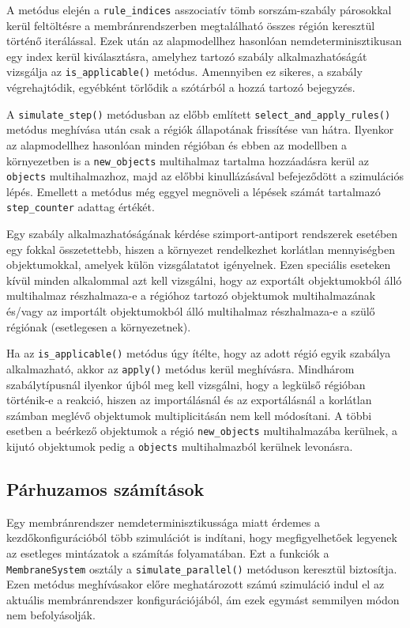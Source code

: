 A metódus elején a \verb|rule_indices| asszociatív tömb sorszám-szabály párosokkal kerül feltöltésre a membránrendszerben megtalálható összes régión keresztül történő iterálással. Ezek után az alapmodellhez hasonlóan nemdeterminisztikusan egy index kerül kiválasztásra, amelyhez tartozó szabály alkalmazhatóságát vizsgálja az \verb|is_applicable()| metódus. Amennyiben ez sikeres, a szabály végrehajtódik, egyébként törlődik a szótárból a hozzá tartozó bejegyzés.

A \verb|simulate_step()| metódusban az előbb említett \verb|select_and_apply_rules()| metódus meghívása után csak a régiók állapotának frissítése van hátra. Ilyenkor az alapmodellhez hasonlóan minden régióban és ebben az modellben a környezetben is a \verb|new_objects| multihalmaz tartalma hozzáadásra kerül az \verb|objects| multihalmazhoz, majd az előbbi kinullázásával befejeződött a szimulációs lépés. Emellett a metódus még eggyel megnöveli a lépések számát tartalmazó \verb|step_counter| adattag értékét.

Egy szabály alkalmazhatóságának kérdése szimport-antiport rendszerek esetében egy fokkal összetettebb, hiszen a környezet rendelkezhet korlátlan mennyiségben objektumokkal, amelyek külön vizsgálatatot igényelnek. Ezen speciális eseteken kívül minden alkalommal azt kell vizsgálni, hogy az exportált objektumokból álló multihalmaz részhalmaza-e a régióhoz tartozó objektumok multihalmazának és/vagy az importált objektumokból álló multihalmaz részhalmaza-e a szülő régiónak (esetlegesen a környezetnek).

Ha az \verb|is_applicable()| metódus úgy ítélte, hogy az adott régió egyik szabálya alkalmazható, akkor az \verb|apply()| metódus kerül meghívásra. Mindhárom szabálytípusnál ilyenkor újból meg kell vizsgálni, hogy a legkülső régióban történik-e a reakció, hiszen az importálásnál és az exportálásnál a korlátlan számban meglévő objektumok multiplicitásán nem kell módosítani. A többi esetben a beérkező objektumok a régió \verb|new_objects| multihalmazába kerülnek, a kijutó objektumok pedig a \verb|objects| multihalmazból kerülnek levonásra.


\subsection{Párhuzamos számítások}

Egy membránrendszer nemdeterminisztikussága miatt érdemes a kezdőkonfigurációból több szimulációt is indítani, hogy megfigyelhetőek legyenek az esetleges mintázatok a számítás folyamatában. Ezt a funkciók a \verb|MembraneSystem| osztály a \verb|simulate_parallel()| metóduson keresztül biztosítja. Ezen metódus meghívásakor előre meghatározott számú szimuláció indul el az aktuális membránrendszer konfigurációjából, ám ezek egymást semmilyen módon nem befolyásolják.

